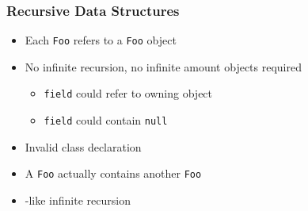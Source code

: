 \begin{frame}
  \frametitle{Recursive Data Structures}
  \begin{itemize}
    \item Each \texttt{Foo} refers to a \texttt{Foo} object
    \item No infinite recursion, no infinite amount objects required
          \begin{itemize}
            \item \texttt{field} could refer to owning object
            \item \texttt{field} could contain \texttt{null}
          \end{itemize}
  \end{itemize}
  \structure{\cpp}
  \begin{itemize}
    \item Invalid class declaration
    \item A \texttt{Foo} actually contains another \texttt{Foo}
    \item {}-like infinite recursion
  \end{itemize}
\end{frame}

